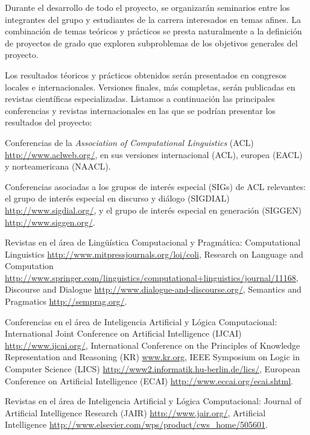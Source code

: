 
Durante el desarrollo de todo el proyecto, se organizar\'an seminarios
entre los integrantes del grupo y estudiantes de la carrera
interesados en temas afines.  La combinaci\'on de temas te\'oricos y
pr\'acticos se presta naturalmente a la definici\'on de proyectos de
grado que exploren subproblemas de los objetivos generales del proyecto.

Los resultados t\'eoricos y pr\'acticos obtenidos ser\'an presentados en
congresos locales e internacionales.  Versiones finales, m\'as
completas, ser\'an publicadas en revistas cient\'ificas especializadas.
Listamos a continuaci\'on las principales conferencias y revistas 
internacionales en las que se podr\'ian presentar los resultados del proyecto:

\begin{myitemize}
\item Conferencias de la \emph{Association of Computational Linguistics}
(ACL) \url{http://www.aclweb.org/}, en sus versiones internacional (ACL),
europea (EACL) y norteamericana (NAACL). 

\item Conferencias asociadas a los grupos de inter\'es especial (SIGs) de
ACL relevantes: el grupo de inter\'es especial en discurso y di\'alogo
(SIGDIAL) \url{http://www.sigdial.org/}, y el grupo de inter\'es especial en
generaci\'on (SIGGEN) \url{http://www.siggen.org/}. 

\item Revistas en el \'area de Ling\"u\'istica Computacional y Pragm\'atica: 
Computational Linguistics
\url{http://www.mitpressjournals.org/loi/coli}, Research on Language and Computation
\url{http://www.springer.com/linguistics/computational+linguistics/journal/11168},
Discourse and Dialogue \url{http://www.dialogue-and-discourse.org/},
Semantics and Pragmatics \url{http://semprag.org/}.

\item Conferencias en el \'area de Inteligencia Artificial y L\'ogica
Computacional: 
International Joint Conference on Artificial Intelligence (IJCAI) 
\url{http://www.ijcai.org/}, International Conference on the Principles of 
Knowledge Representation and Reasoning (KR) \url{www.kr.org}, 
IEEE Symposium on Logic in Computer Science 
(LICS) \url{http://www2.informatik.hu-berlin.de/lics/},
European Conference on Artificial Intelligence (ECAI) \url{http://www.eccai.org/ecai.shtml}.

\item Revistas en el \'area de Inteligencia Artificial y L\'ogica 
Computacional: Journal of Artificial Intelligence Research (JAIR) 
\url{http://www.jair.org/}, Artificial Intelligence 
\url{http://www.elsevier.com/wps/product/cws_home/505601}.


\end{myitemize}

